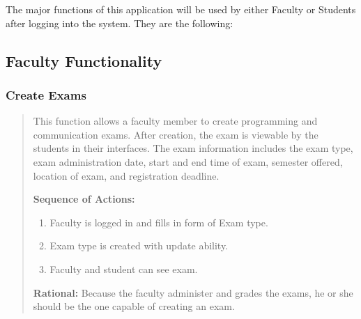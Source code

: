 
The major functions of this application will be used by either Faculty or Students
after logging into the system. They are the following:

\subsection*{Faculty Functionality}

   \subsubsection{Create Exams}
   \begin{quote} %
         This function allows a faculty member to create
         programming and communication exams. After creation, the exam is
         viewable by the students in their interfaces. The exam information
         includes the exam type, exam administration
         date, start and end time of exam, semester offered, location of
         exam, and registration deadline.

         \textbf{Sequence of Actions:}
         \begin{enumerate}
            \item Faculty is logged in and fills in form of Exam type.
            \item Exam type is created with update ability.
            \item Faculty and student can see exam.
         \end{enumerate}

         \textbf{Rational:}
         Because the faculty administer and grades the exams, he or she should
         be the one capable of creating an exam.
   \end{quote} %

